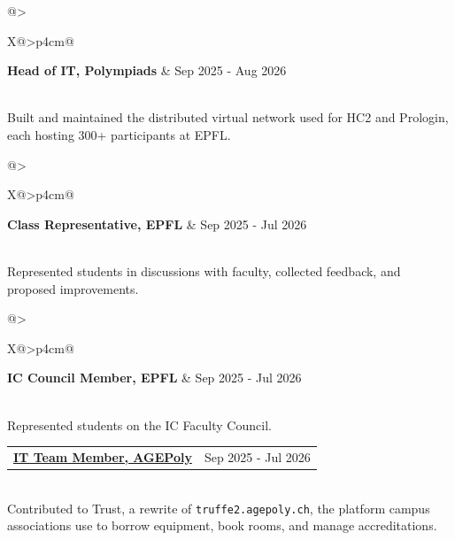 \documentclass[a4paper,11pt]{article}
\makeatletter
\newenvironment{jobshort}[2]
{\noindent\begin{tabularx}{\linewidth}{@{}>{\raggedright\arraybackslash}X@{\hspace{1em}}>{\raggedleft\arraybackslash}p{4cm}@{}}
\textbf{#1} & #2
\end{tabularx}\\}
{\vspace{2pt}}
\makeatother
\begin{document}
\begin{jobshort}{Head of IT, Polympiads}{Sep 2025 - Aug 2026}
Built and maintained the distributed virtual network used for HC2 and Prologin, each hosting 300+ participants at EPFL.
\end{jobshort}

\begin{jobshort}{Class Representative, EPFL}{Sep 2025 - Jul 2026}
Represented students in discussions with faculty, collected feedback, and proposed improvements.
\end{jobshort}

\begin{jobshort}{IC Council Member, EPFL}{Sep 2025 - Jul 2026}
Represented students on the IC Faculty Council.
\end{jobshort}

\begin{jobshort}{\href{https://gitlab.com/agepoly/it/dev/trust}{IT Team Member, AGEPoly}}{Sep 2025 - Jul 2026}
Contributed to Trust, a rewrite of \texttt{truffe2.agepoly.ch}, the platform campus associations use to borrow equipment, book rooms, and manage accreditations.
\end{jobshort}
\end{document}
